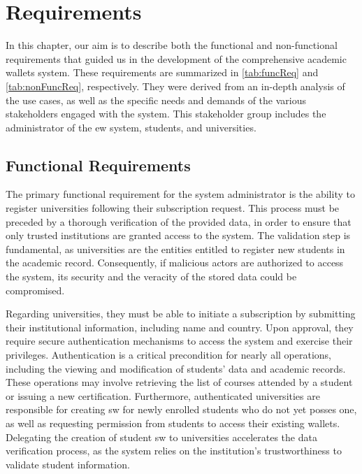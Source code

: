 \chapter{Requirements}
\label{chap:requirements}
In this chapter, our aim is to describe both the functional and non-functional requirements that guided us in the development of the comprehensive academic wallets system. These requirements are summarized in \cref{tab:funcReq} and \cref{tab:nonFuncReq}, respectively. They were derived from an in-depth analysis of the use cases, as well as the specific needs and demands of the various stakeholders engaged with the system. This stakeholder group includes the administrator of the \acrfull{ew} system, students, and universities.

\section{Functional Requirements}
The primary functional requirement for the system administrator is the ability to register universities following their subscription request. This process must be preceded by a thorough verification of the provided data, in order to ensure that only trusted institutions are granted access to the system. The validation step is fundamental, as universities are the entities entitled to register new students in the academic record. Consequently, if malicious actors are authorized to access the system, its security and the veracity of the stored data could be compromised.

Regarding universities, they must be able to initiate a subscription by submitting their institutional information, including name and country. Upon approval, they require secure authentication mechanisms to access the system and exercise their privileges. Authentication is a critical precondition for nearly all operations, including the viewing and modification of students' data and academic records. These operations may involve retrieving the list of courses attended by a student or issuing a new certification. Furthermore, authenticated universities are responsible for creating \acrfull{sw} for newly enrolled students who do not yet posses one, as well as requesting permission from students to access their existing wallets. Delegating the creation of student \acrshort{sw} to universities accelerates the data verification process, as the system relies on the institution's trustworthiness to validate student information. 


